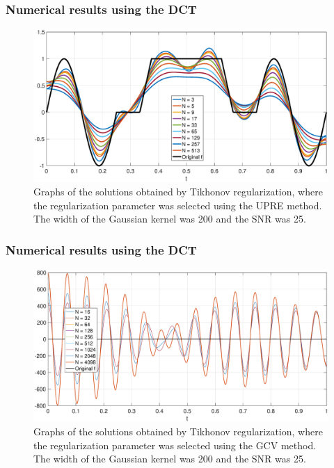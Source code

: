 \documentclass[t]{beamer}
\begin{document}
\begin{frame}
\frametitle{Numerical results using the DCT}
\begin{figure}
\centering
\includegraphics[scale=0.25]{Figures/UPRE_Sols.eps}
\caption{Graphs of the solutions obtained by Tikhonov regularization, where the regularization parameter was selected using the UPRE method. The width of the Gaussian kernel was 200 and the SNR was 25.}
\end{figure}
\end{frame}

\begin{frame}
\frametitle{Numerical results using the DCT}
\begin{figure}
\centering
\includegraphics[scale=0.25]{Figures/GCV_Sols.eps}
\caption{Graphs of the solutions obtained by Tikhonov regularization, where the regularization parameter was selected using the GCV method. The width of the Gaussian kernel was 200 and the SNR was 25.}
\end{figure}
\end{frame}
\end{document}
